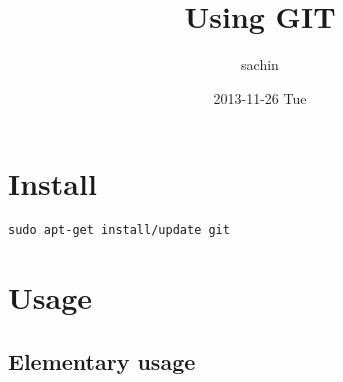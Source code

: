 \documentclass[11pt]{article}
\title{Using GIT}
\author{sachin}
\date{2013-11-26 Tue}
\begin{document}
\maketitle

\setcounter{tocdepth}{3}
\tableofcontents
\vspace*{1cm}

\section{Install}
\label{sec-1}


\begin{verbatim}
sudo apt-get install/update git
\end{verbatim}
\section{Usage}
\label{sec-2}
\subsection{Elementary usage}
\label{sec-2-1}
\end{document}
